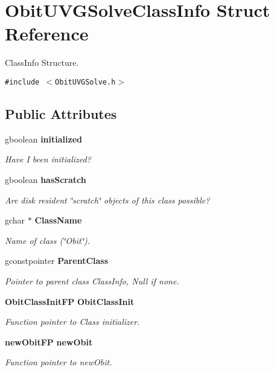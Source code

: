 \section{Obit\-UVGSolve\-Class\-Info Struct Reference}
\label{structObitUVGSolveClassInfo}
Class\-Info Structure.  


{\tt \#include $<$Obit\-UVGSolve.h$>$}

\subsection*{Public Attributes}
\begin{CompactItemize}
\item 
gboolean {\bf initialized}
\begin{CompactList}\small\item\em Have I been initialized? \item\end{CompactList}\item 
gboolean {\bf has\-Scratch}
\begin{CompactList}\small\item\em Are disk resident \char`\"{}scratch\char`\"{} objects of this class possible? \item\end{CompactList}\item 
gchar $\ast$ {\bf Class\-Name}
\begin{CompactList}\small\item\em Name of class (\char`\"{}Obit\char`\"{}). \item\end{CompactList}\item 
gconstpointer {\bf Parent\-Class}
\begin{CompactList}\small\item\em Pointer to parent class Class\-Info, Null if none. \item\end{CompactList}\item 
{\bf Obit\-Class\-Init\-FP} {\bf Obit\-Class\-Init}
\begin{CompactList}\small\item\em Function pointer to Class initializer. \item\end{CompactList}\item 
{\bf new\-Obit\-FP} {\bf new\-Obit}
\begin{CompactList}\small\item\em Function pointer to new\-Obit. \item\end{CompactList}\item 

\end{CompactItemize}
